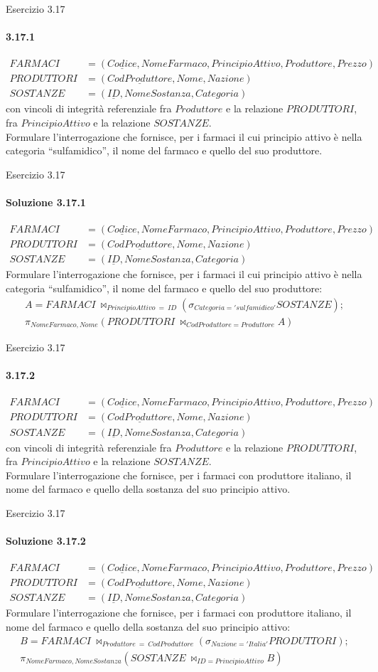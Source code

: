 \def\schemaEx3.17{\small \begin{align*}
    FARMACI &= (\underline{Codice}, NomeFarmaco, PrincipioAttivo, Produttore, Prezzo)\\
    PRODUTTORI &= (\underline{CodProduttore}, Nome, Nazione)\\
    SOSTANZE &= (\underline{ID}, NomeSostanza, Categoria)
    \end{align*}}
\begin{frame}{Esercizio 3.17}
    \framesubtitle{3.17.1}
    \schemaEx3.17
    con vincoli di integrit\`a referenziale fra $Produttore$ e la relazione $PRODUTTORI$, fra $PrincipioAttivo$ e la relazione $SOSTANZE$.
    \newline
    \\Formulare l'interrogazione che fornisce, per i farmaci il cui principio attivo \`e nella categoria ``sulfamidico'', il nome del farmaco e quello del suo produttore.
\end{frame}
%
\begin{frame}{Esercizio 3.17}
    \framesubtitle{Soluzione 3.17.1}
    \vspace*{-1.2cm}
    \schemaEx3.17
    {\small Formulare l'interrogazione che fornisce, per i farmaci il cui principio attivo \`e nella categoria ``sulfamidico'', il nome del farmaco e quello del suo produttore:}
    \small
    \begin{gather*}
        A = FARMACI~\bowtie_{PrincipioAttivo~=~ID}(\sigma_{Categoria='sulfamidico'} SOSTANZE);\\
        \pi_{NomeFarmaco,Nome} (PRODUTTORI~\bowtie_{CodProduttore=Produttore} A)
    \end{gather*}
\end{frame}
%
\begin{frame}{Esercizio 3.17}
    \framesubtitle{3.17.2}
    \schemaEx3.17
    con vincoli di integrit\`a referenziale fra $Produttore$ e la relazione $PRODUTTORI$, fra $PrincipioAttivo$ e la relazione $SOSTANZE$.
    \newline
    \\Formulare l'interrogazione che fornisce, per i farmaci con produttore italiano, il nome del farmaco e quello della sostanza del suo principio attivo.
\end{frame}
%
\begin{frame}{Esercizio 3.17}
    \framesubtitle{Soluzione 3.17.2}
    \vspace*{-1.2cm}
    \schemaEx3.17
    {\small Formulare l'interrogazione che fornisce, per i farmaci con produttore italiano, il nome del farmaco e quello della sostanza del suo principio attivo:}
    \small
    \begin{gather*}
        B = FARMACI~\bowtie_{Produttore~=~CodProduttore}(\sigma_{Nazione='Italia'} PRODUTTORI);\\
        \pi_{NomeFarmaco,NomeSostanza} (SOSTANZE~\bowtie_{ID=PrincipioAttivo} B)
    \end{gather*}
\end{frame}